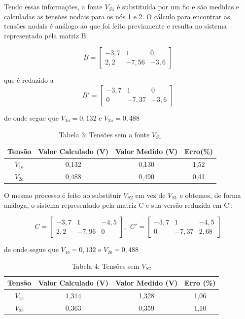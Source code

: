 \documentclass[a4 paper]{article}
\begin{document}
\newpage Tendo essas informações, a fonte $V_{S1}$ é substituída por um fio e são medidas e calculadas as tensões nodais para os nós 1 e 2.
O cálculo para encontrar as tensões nodais é análogo ao que foi feito previamente e resulta no sistema representado pela matriz B:

\[B=
\begin{bmatrix}
-3,7 & 1 & 0\\
2,2 & -7,56 & -3,6
\end{bmatrix}
\]

\noindent que é reduzido a
\[
B'=
\begin{bmatrix}
-3,7 & 1 & 0\\
0 & -7,37 & -3,6 
\end{bmatrix}
\]

\noindent de onde segue que $V_{1a}=0,132$ e $V_{2a}=0,488$


\vspace{5pt}
\begin{table}[h]
\centering
\begin{tabular}{|c|c|c|c|}
\hline
 Tensão & Valor Calculado (V) & Valor Medido (V) & Erro(\%) \\\hline
$V_{1a}$ & 0,132 & 0,130 & 1,52 \\\hline
$V_{2a}$ & 0,488 & 0,490 & 0,41\\\hline
\end{tabular}
\caption*{Tabela 3: Tensões sem a fonte $V_{S1}$}
\end{table}

O mesmo processo é feito ao substituir $V_{S2}$ em vez de $V_{S1}$ e obtemos, de forma análoga, o sistema representado pela matriz C e sua versão reduzida em C':

\[
C=
\begin{bmatrix}
-3,7&1&-4,5\\
2,2&-7,96&0
\end{bmatrix},\ \ 
C'=
\begin{bmatrix}
-3,7&1&-4,5\\
0&-7,37&2,68
\end{bmatrix}
\]

\noindent de onde segue que $V_{1b}=0,132$ e $V_{2b}=0,488$

\vspace{5pt}
\begin{table}[h]
\centering
\begin{tabular}{|c|c|c|c|}
\hline
Tensão & Valor Calculado (V) & Valor Medido (V) & Erro (\%) \\\hline
 $V_{1b}$&1,314 &1,328 & 1,06\\\hline
 $V_{2b}$&0,363 &0,359 &1,10 \\\hline
\end{tabular}
\caption*{Tabela 4: Tensões sem $V_{S2}$}
\end{table}
\end{document}
